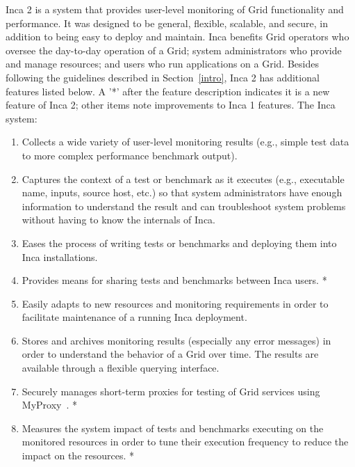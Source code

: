 \documentclass[times,10pt,twocolumn]{article}
\begin{document}
Inca 2 is a system that provides user-level monitoring of Grid functionality
and performance.  It was designed to be
general, flexible, scalable, and secure, in addition to being easy to deploy
and maintain.  Inca benefits Grid operators who oversee the day-to-day
operation of a Grid; system administrators who provide and manage resources;
and users who run applications on a Grid.  Besides following the guidelines 
described in Section~\ref{intro}, Inca 2 has additional features
listed below.  A '*' after the feature description indicates it is a new
feature of Inca 2; other items note improvements to Inca 1 features.  The 
Inca system:

\begin{enumerate}

\item Collects a wide variety of user-level monitoring results (e.g., simple
test data to more complex performance benchmark output).  

\item Captures the context of a test or benchmark as it executes (e.g.,
executable name, inputs, source host, etc.) so that system administrators have
enough information to understand the result and can troubleshoot system
problems without having to know the internals of Inca. 

\item Eases the process of writing tests or benchmarks and deploying them into
Inca installations. 

\item Provides means for sharing tests and benchmarks between Inca users. *

\item Easily adapts to new resources and monitoring requirements in order to
facilitate maintenance of a running Inca deployment. 

\item Stores and archives monitoring results (especially any error messages) 
in order to understand the behavior of a Grid over time. The results
are available through a flexible querying interface.

\item Securely manages short-term proxies for testing of Grid services using
MyProxy~\cite{myproxy}. *

\item Measures the system impact of tests and benchmarks executing on
the monitored resources in order to tune their execution frequency to
reduce the impact on the resources. *

\end{enumerate}
\end{document}

